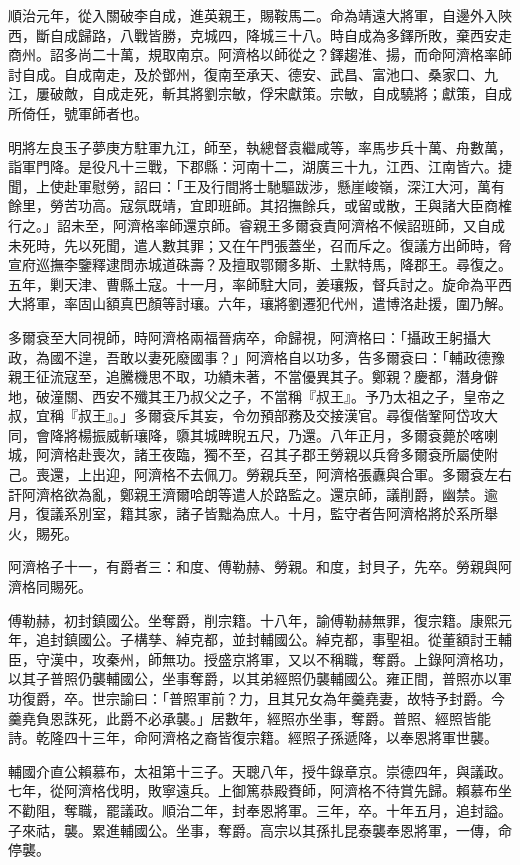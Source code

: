 \begin{pinyinscope}
順治元年，從入關破李自成，進英親王，賜鞍馬二。命為靖遠大將軍，自邊外入陜西，斷自成歸路，八戰皆勝，克城四，降城三十八。時自成為多鐸所敗，棄西安走商州。詔多尚二十萬，規取南京。阿濟格以師從之？鐸趨淮、揚，而命阿濟格率師討自成。自成南走，及於鄧州，復南至承天、德安、武昌、富池口、桑家口、九江，屢破敵，自成走死，斬其將劉宗敏，俘宋獻策。宗敏，自成驍將；獻策，自成所倚任，號軍師者也。

明將左良玉子夢庚方駐軍九江，師至，執總督袁繼咸等，率馬步兵十萬、舟數萬，詣軍門降。是役凡十三戰，下郡縣：河南十二，湖廣三十九，江西、江南皆六。捷聞，上使赴軍慰勞，詔曰：「王及行間將士馳驅跋涉，懸崖峻嶺，深江大河，萬有餘里，勞苦功高。寇氛既靖，宜即班師。其招撫餘兵，或留或散，王與諸大臣商榷行之。」詔未至，阿濟格率師還京師。睿親王多爾袞責阿濟格不候詔班師，又自成未死時，先以死聞，遣人數其罪；又在午門張蓋坐，召而斥之。復議方出師時，脅宣府巡撫李鑒釋逮問赤城道硃壽？及擅取鄂爾多斯、土默特馬，降郡王。尋復之。五年，剿天津、曹縣土寇。十一月，率師駐大同，姜瓖叛，督兵討之。旋命為平西大將軍，率固山額真巴顏等討瓖。六年，瓖將劉遷犯代州，遣博洛赴援，圍乃解。

多爾袞至大同視師，時阿濟格兩福晉病卒，命歸視，阿濟格曰：「攝政王躬攝大政，為國不遑，吾敢以妻死廢國事？」阿濟格自以功多，告多爾袞曰：「輔政德豫親王征流寇至，追騰機思不取，功績未著，不當優異其子。鄭親？慶都，潛身僻地，破潼關、西安不殲其王乃叔父之子，不當稱『叔王』。予乃太祖之子，皇帝之叔，宜稱『叔王』。」多爾袞斥其妄，令勿預部務及交接漢官。尋復偕鞏阿岱攻大同，會降將楊振威斬瓖降，隳其城睥睨五尺，乃還。八年正月，多爾袞薨於喀喇城，阿濟格赴喪次，諸王夜臨，獨不至，召其子郡王勞親以兵脅多爾袞所屬使附己。喪還，上出迎，阿濟格不去佩刀。勞親兵至，阿濟格張纛與合軍。多爾袞左右訐阿濟格欲為亂，鄭親王濟爾哈朗等遣人於路監之。還京師，議削爵，幽禁。逾月，復議系別室，籍其家，諸子皆黜為庶人。十月，監守者告阿濟格將於系所舉火，賜死。

阿濟格子十一，有爵者三：和度、傅勒赫、勞親。和度，封貝子，先卒。勞親與阿濟格同賜死。

傅勒赫，初封鎮國公。坐奪爵，削宗籍。十八年，諭傅勒赫無罪，復宗籍。康熙元年，追封鎮國公。子構孳、綽克都，並封輔國公。綽克都，事聖祖。從董額討王輔臣，守漢中，攻秦州，師無功。授盛京將軍，又以不稱職，奪爵。上錄阿濟格功，以其子普照仍襲輔國公，坐事奪爵，以其弟經照仍襲輔國公。雍正間，普照亦以軍功復爵，卒。世宗諭曰：「普照軍前？力，且其兄女為年羹堯妻，故特予封爵。今羹堯負恩誅死，此爵不必承襲。」居數年，經照亦坐事，奪爵。普照、經照皆能詩。乾隆四十三年，命阿濟格之裔皆復宗籍。經照子孫遞降，以奉恩將軍世襲。

輔國介直公賴慕布，太祖第十三子。天聰八年，授牛錄章京。崇德四年，與議政。七年，從阿濟格伐明，敗寧遠兵。上御篤恭殿賚師，阿濟格不待賞先歸。賴慕布坐不勸阻，奪職，罷議政。順治二年，封奉恩將軍。三年，卒。十年五月，追封謚。子來祜，襲。累進輔國公。坐事，奪爵。高宗以其孫扎昆泰襲奉恩將軍，一傳，命停襲。


\end{pinyinscope}